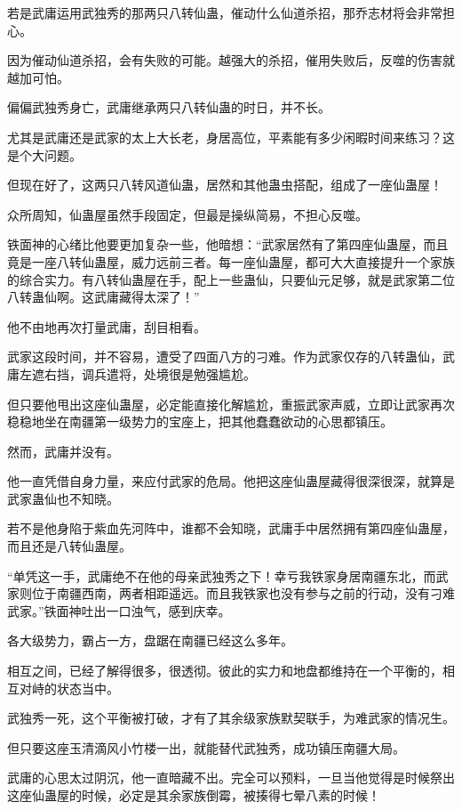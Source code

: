 \begin{this_body}
若是武庸运用武独秀的那两只八转仙蛊，催动什么仙道杀招，那乔志材将会非常担心。

因为催动仙道杀招，会有失败的可能。越强大的杀招，催用失败后，反噬的伤害就越加可怕。

偏偏武独秀身亡，武庸继承两只八转仙蛊的时日，并不长。

尤其是武庸还是武家的太上大长老，身居高位，平素能有多少闲暇时间来练习？这是个大问题。

但现在好了，这两只八转风道仙蛊，居然和其他蛊虫搭配，组成了一座仙蛊屋！

众所周知，仙蛊屋虽然手段固定，但最是操纵简易，不担心反噬。

铁面神的心绪比他要更加复杂一些，他暗想：“武家居然有了第四座仙蛊屋，而且竟是一座八转仙蛊屋，威力远前三者。每一座仙蛊屋，都可大大直接提升一个家族的综合实力。有八转仙蛊屋在手，配上一些蛊仙，只要仙元足够，就是武家第二位八转蛊仙啊。这武庸藏得太深了！”

他不由地再次打量武庸，刮目相看。

武家这段时间，并不容易，遭受了四面八方的刁难。作为武家仅存的八转蛊仙，武庸左遮右挡，调兵遣将，处境很是勉强尴尬。

但只要他甩出这座仙蛊屋，必定能直接化解尴尬，重振武家声威，立即让武家再次稳稳地坐在南疆第一级势力的宝座上，把其他蠢蠢欲动的心思都镇压。

然而，武庸并没有。

他一直凭借自身力量，来应付武家的危局。他把这座仙蛊屋藏得很深很深，就算是武家蛊仙也不知晓。

若不是他身陷于紫血先河阵中，谁都不会知晓，武庸手中居然拥有第四座仙蛊屋，而且还是八转仙蛊屋。

“单凭这一手，武庸绝不在他的母亲武独秀之下！幸亏我铁家身居南疆东北，而武家则位于南疆西南，两者相距遥远。而且我铁家也没有参与之前的行动，没有刁难武家。”铁面神吐出一口浊气，感到庆幸。

各大级势力，霸占一方，盘踞在南疆已经这么多年。

相互之间，已经了解得很多，很透彻。彼此的实力和地盘都维持在一个平衡的，相互对峙的状态当中。

武独秀一死，这个平衡被打破，才有了其余级家族默契联手，为难武家的情况生。

但只要这座玉清滴风小竹楼一出，就能替代武独秀，成功镇压南疆大局。

武庸的心思太过阴沉，他一直暗藏不出。完全可以预料，一旦当他觉得是时候祭出这座仙蛊屋的时候，必定是其余家族倒霉，被揍得七晕八素的时候！

\end{this_body}

